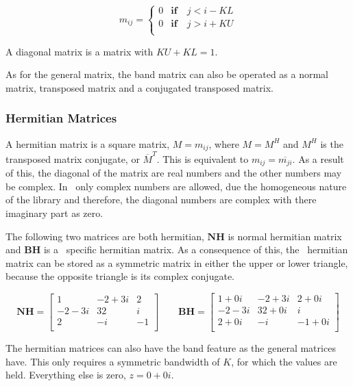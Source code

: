 \begin{equation}
m_{ij} = \left\{
\begin{array}{rl}
0 & \mathbf{if} \quad j < i - KL \\
0 & \mathbf{if} \quad j > i + KU \\
\end{array} \right.
\label{eq:bandmatrix}
\end{equation}

A diagonal matrix is a matrix with $KU + KL = 1$.

As for the general matrix, the band matrix can also be operated as a
normal matrix, transposed matrix and a conjugated transposed matrix.

\subsubsection{Hermitian Matrices}

A hermitian matrix is a square matrix, $M = m_{ij}$, where $M = M^H$
and $M^H$ is the transposed matrix conjugate, or
$\overline{M}^T$. This is equivalent to $m_{ij}
= \overline{m_{ji}}$. As a result of this, the diagonal of the matrix
are real numbers and the other numbers may be complex. In \BLAS\ only
complex numbers are allowed, due the homogeneous nature of the library
and therefore, the diagonal numbers are complex with there imaginary
part as zero.

The following two matrices are both hermitian, $\mathbf{NH}$ is normal
hermitian matrix and $\mathbf{BH}$ is a \BLAS\ specific hermitian
matrix. As a consequence of this, the \BLAS\ hermitian matrix can be
stored as a symmetric matrix in either the upper or lower triangle,
because the opposite triangle is its complex conjugate.

\[
\mathbf{NH} = \left[
\begin{array}{ccc}
1       & -2 + 3i & 2  \\
-2 - 3i & 32      & i  \\
2       & -i      & -1 \\
\end{array}
\right]
\qquad
\mathbf{BH} = \left[
\begin{array}{ccc}
1 + 0i  & -2 + 3i & 2 + 0i      \\
-2 - 3i & 32 + 0i & i       \\
2 + 0i       & -i      & -1 + 0i \\
\end{array}
\right]
\]

The hermitian matrices can also have the band feature as the general
matrices have. This only requires a symmetric bandwidth of $K$, for
which the values are held. Everything else is zero, $z = 0 + 0i$.


